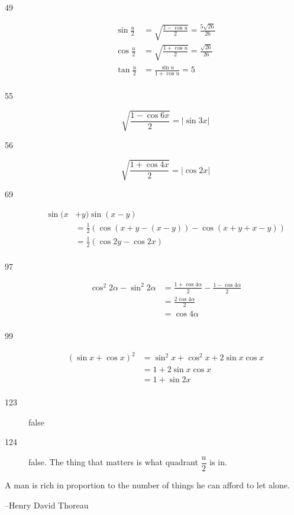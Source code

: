 \documentclass[fleqn,addpoints]{exam}
\begin{document}
\begin{description}
\item[49]
\begin{align*}
  \sin \frac{u}{2} &= \sqrt{ \frac{1 - \cos u}{2} } = \frac{5 \sqrt{26}}{26} \\
  \cos \frac{u}{2} &= \sqrt{ \frac{1 + \cos u}{2} } = \frac{\sqrt{26}}{26} \\
  \tan \frac{u}{2} &= \frac{\sin u}{1 + \cos u} = 5 \\
\end{align*}

\item[55]
\[
  \sqrt{\frac{1 - \cos 6x}{2}} = |\sin 3x|
\]

\item[56]
\[
  \sqrt{\frac{1 + \cos 4x}{2}} = |\cos 2x|
\]

\item[69]
\begin{align*}
  \sin(x &+y) \sin(x-y) \\
  &= \frac{1}{2} ( \cos(x+y - (x-y)) - \cos(x+y+x-y) ) \\
  &= \frac{1}{2} (\cos 2y - \cos 2x) \\
\end{align*}

\item[97]
\begin{align*}
  \cos^2 2 \alpha - \sin^2 2 \alpha &= \frac{1 + \cos 4 \alpha}{2} - \frac{1 - \cos 4 \alpha}{2} \\
  &= \frac{2 \cos 4 \alpha}{2} \\
  &= \cos 4 \alpha \\
\end{align*}

\item[99]
\begin{align*}
  (\sin x + \cos x)^2 &= \sin^2 x + \cos^2 x + 2 \sin x \cos x \\
  &= 1 + 2 \sin x \cos x \\
  &= 1 + \sin 2x \\
\end{align*}

\item[123]
false

\item[124]
false.  The thing that matters is what quadrant $\dfrac{u}{2}$ is in.  

\end{description}

\else

\vspace{2 in}

\begin{em}
  A man is rich in proportion to the number of things he can afford to let alone.
\end{em}

\vspace{.2 cm}
\hspace{1.5 cm} --Henry David Thoreau

\fi
\end{document}
